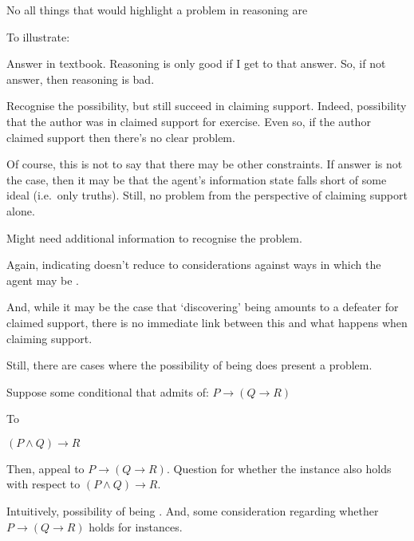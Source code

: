 \begin{note}
  No all things that would highlight a problem in reasoning are 

  To illustrate:

  \begin{illustration}
    \label{illu:textbook-answers}
    Answer in textbook.
    Reasoning is only good if I get to that answer.
    So, if not answer, then reasoning is bad.
  \end{illustration}

  Recognise the possibility, but still succeed in claiming support.
  Indeed, possibility that the author was \mom{} in claimed support for exercise.
  Even so, if the author claimed support then there's no clear problem.

  Of course, this is not to say that there may be other constraints.
  If answer is not the case, then it may be that the agent's information state falls short of some ideal (i.e.\ only truths).
  Still, no problem from the perspective of claiming support alone.

  Might need additional information to recognise the problem.

  Again, indicating doesn't reduce to considerations against ways in which the agent may be \mom{}.

  And, while it may be the case that `discovering' being \mom{} amounts to a defeater for claimed support, there is no immediate link between this and what happens when claiming support.
\end{note}

\begin{note}
  Still, there are cases where the possibility of being \mom{} does present a problem.

  \begin{illustration}
    Suppose some conditional that admits of:
    \(P \rightarrow (Q \rightarrow R)\)

    To

    \((P \land Q) \rightarrow R\)

    Then, appeal to \(P \rightarrow (Q \rightarrow R)\).
    Question for whether the instance also holds with respect to \((P \land Q) \rightarrow R\).
  \end{illustration}

  Intuitively, possibility of being \mistaken{}.
  And, some consideration regarding whether \(P \rightarrow (Q \rightarrow R)\) holds for instances.
\end{note}

